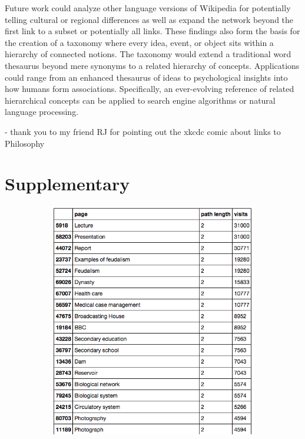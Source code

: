 \documentclass[twoside]{article}
\begin{document}
Future work could analyze other language versions of Wikipedia for potentially telling cultural or regional differences as well as expand the network beyond the first link to a subset or potentially all links.
These findings also form the basis for the creation of a taxonomy where 
every idea, event, or object sits within a hierarchy of connected notions.
The taxonomy would extend a traditional word thesaurus beyond mere synonyms to a related hierarchy of concepts.
Applications could range from an enhanced thesaurus of ideas to psychological insights into how humans form associations.
Specifically, an ever-evolving reference of related hierarchical concepts can be applied to search engine algorithms 
or natural language processing.

- thank you to my friend RJ for pointing out the xkcdc comic about links to Philosophy



\section{Supplementary}

\begin{figure}[H]
\centering
\caption{highest ranking 2-Cycles}
    \begin{subfigure}[b]{0.8\textwidth}
        \includegraphics[width=\textwidth]{graphics/top_2loops.png}
    \end{subfigure}
\end{figure}
\end{document}
